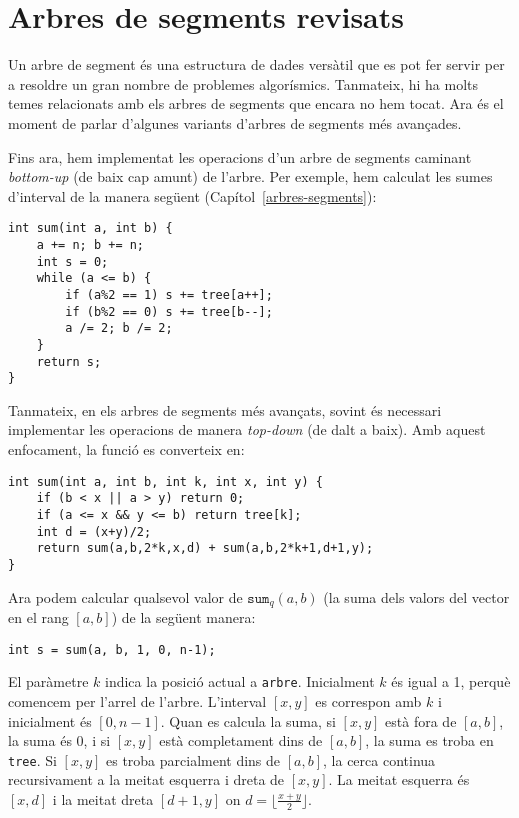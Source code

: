 \chapter{Arbres de segments revisats}


Un arbre de segment és una estructura de dades versàtil que es pot fer
servir per a resoldre un gran nombre de problemes
algorísmics. Tanmateix, hi ha molts temes relacionats amb els arbres
de segments que encara no hem tocat. Ara és el moment de parlar
d'algunes variants d'arbres de segments més avançades.

Fins ara, hem implementat les operacions d'un arbre de segments
caminant \emph{bottom-up} (de baix cap amunt) de l'arbre. Per exemple,
hem calculat les sumes d'interval de la manera següent
(Capítol~\ref{arbres-segments}):


\begin{lstlisting}
int sum(int a, int b) {
    a += n; b += n;
    int s = 0;
    while (a <= b) {
        if (a%2 == 1) s += tree[a++];
        if (b%2 == 0) s += tree[b--];
        a /= 2; b /= 2;
    }
    return s;
}
\end{lstlisting}


Tanmateix, en els arbres de segments més avançats, sovint és necessari
implementar les operacions de manera \emph{top-down} (de dalt a
baix). Amb aquest enfocament, la funció es converteix en:
\begin{lstlisting}
int sum(int a, int b, int k, int x, int y) {
    if (b < x || a > y) return 0;
    if (a <= x && y <= b) return tree[k];
    int d = (x+y)/2;
    return sum(a,b,2*k,x,d) + sum(a,b,2*k+1,d+1,y);
}
\end{lstlisting}


Ara podem calcular qualsevol valor de $\texttt{sum}_q(a,b)$ (la suma
dels valors del vector en el rang $[a,b]$) de la següent manera:
\begin{lstlisting}
int s = sum(a, b, 1, 0, n-1);
\end{lstlisting}


El paràmetre $k$ indica la posició actual a
\texttt{arbre}. Inicialment $k$ és igual a 1, perquè comencem per
l'arrel de l'arbre. L'interval $[x,y]$ es correspon amb $k$ i
inicialment és $[0,n-1]$. Quan es calcula la suma, si $[x,y]$ està
fora de $[a,b]$, la suma és 0, i si $[x,y]$ està completament dins de
$[a,b]$, la suma es troba en \texttt{tree}. Si $[x,y]$ es troba
parcialment dins de $[a,b]$, la cerca continua recursivament a la
meitat esquerra i dreta de $[x,y]$. La meitat esquerra és $[x,d]$ i la
meitat dreta $[d+1,y]$ on $d=\lfloor \frac{x+y}{2} \rfloor$.

